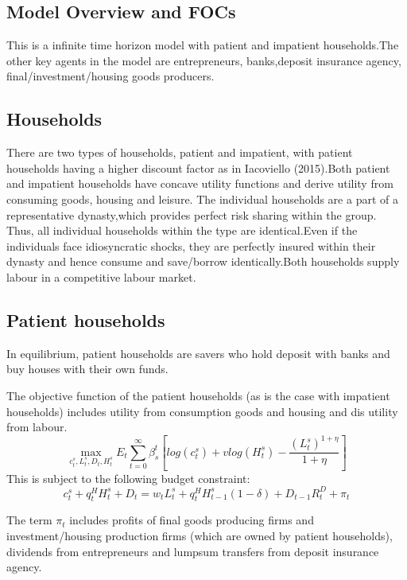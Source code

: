 \documentclass[12pt]{article}
\numberwithin{equation}{section}
\begin{document}
\begin{appendix}
\FloatBarrier

\section{Model Overview and FOCs}
\label{app_modelOverview}
This is a infinite time horizon model with patient and impatient households.The other key agents in the model are entrepreneurs, banks,deposit insurance agency, final/investment/housing goods producers.

\subsection*{Households}

There are two types of households, patient and impatient, with patient households having a higher discount factor as in Iacoviello (2015).Both patient and impatient households have concave utility functions and derive utility from consuming goods, housing and leisure. The individual households are a part of a representative dynasty,which provides perfect risk sharing within the group. Thus, all individual households within the type are identical.Even if the individuals face idiosyncratic shocks, they are perfectly insured within their dynasty and hence consume and save/borrow identically.Both households supply labour in a competitive labour market.

\subsection*{Patient households}
In equilibrium, patient households are savers who hold deposit with banks and buy houses with their own funds. 

The objective function of the patient households (as is the case with impatient households) includes utility from consumption goods and housing and dis utility from labour.
\begin{equation}
\max_{c^s_t,L^s_t,D_{t},H^s_t}E_t\sum _{t=0}^{\infty } \beta_{s}^t [log(c^s_t)+vlog(H^s_t)-\frac{(L^s_t)^{1+\eta}}{1+\eta} ]
\end{equation}
This is subject to the following budget constraint:
\begin{equation}
c^s_t+q^H_{t}H^s_{t} +{D_{t}}=w_{t}L^s_{t}+q^H_{t}H^s_{t-1}(1-\delta)+{D_{t-1}}R^D_{t}+\pi_{t}
\end{equation}

The term $\pi_{t}$ includes profits of final goods producing firms and investment/housing production firms (which are owned by patient households), dividends from entrepreneurs and lumpsum transfers from deposit insurance agency. 


\end{appendix}
\end{document}
